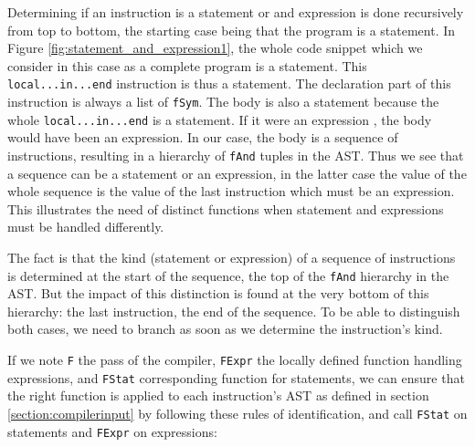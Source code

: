 \documentclass[a4paper]{memoir}
\begin{document}
Determining if an instruction is a statement or and expression is done
recursively from top to bottom, the starting case being that the program is a
statement. In Figure \ref{fig:statement_and_expression1}, the
whole code snippet which we consider in this case as a complete program is a
statement. This \lstinline!local...in...end! instruction is thus a statement.
The declaration part of this instruction is always a list of \lstinline!fSym!. The body is
also a statement because the whole \lstinline!local...in...end! is a statement. If it were
an expression , the body
would have been an expression. In our case, the body is a sequence of
instructions, resulting in a hierarchy of \lstinline!fAnd! tuples in the AST. Thus we see that a sequence
can be a statement or an expression, in the latter case the value
of the whole sequence is the value of the last instruction which must be an expression. This illustrates the
need of distinct functions when statement and expressions must be handled
differently. 

The fact is that the kind (statement or
expression) of a sequence of instructions is determined at the start of the
sequence, the top of the \lstinline!fAnd! hierarchy in the AST. But the impact of this
distinction is found at the very bottom of this hierarchy: the last
instruction, the end of the sequence. To be able to distinguish both cases, we
need to branch as soon as we determine the instruction's kind.

If we note \lstinline!F! the pass of the compiler, \lstinline!FExpr! the locally defined
function handling expressions, and \lstinline!FStat! corresponding function for
statements, we can ensure that the right function is applied to each
instruction's AST as defined in section \ref{section:compilerinput} by following
these rules of identification, and call \lstinline!FStat! on statements and
\lstinline!FExpr! on expressions:
\end{document}
